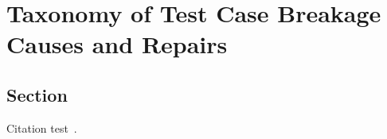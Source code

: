\chapter{Taxonomy of Test Case Breakage Causes and Repairs}\label{chapter:introduction}

\section{Section}
Citation test~\parencite{latex}.